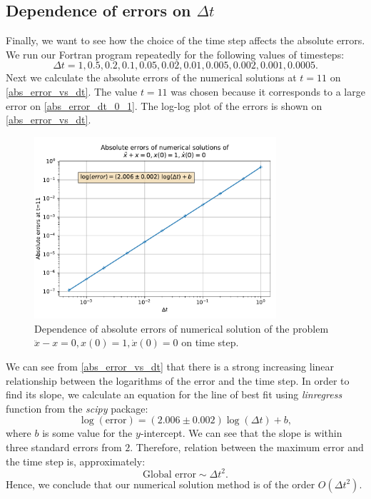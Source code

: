 \subsection{Dependence of errors on $\Delta t$}

Finally, we want to see how the choice of the time step affects the absolute errors. We run our Fortran program repeatedly for the following values of timesteps:
\[
  \Delta t = 1, 0.5, 0.2, 0.1, 0.05, 0.02, 0.01, 0.005, 0.002, 0.001, 0.0005.
\]
Next we calculate the absolute errors of the numerical solutions at $t=11$ on \autoref{abs_error_vs_dt}. The value $t=11$ was chosen because it corresponds to a large error on \autoref{abs_error_dt_0_1}. The log-log plot of the errors is shown on \autoref{abs_error_vs_dt}.

\begin{figure}[H]
  \centering
  \includegraphics[width=0.8\textwidth]{figures/abs_error_vs_dt.pdf}
  \caption{Dependence of absolute errors of numerical solution of the problem $\ddot{x} - x = 0, x(0)=1, \dot{x}(0)=0$ on time step.}
  \label{abs_error_vs_dt}
\end{figure}

We can see from \autoref{abs_error_vs_dt} that there is a strong increasing linear relationship between the logarithms of the error and the time step. In order to find its slope, we calculate an equation for the line of best fit using \emph{linregress} function from the \emph{scipy} package:
\[
  \log(\textrm{error}) = (2.006 \pm 0.002) \log(\Delta t) + b,
\]
where $b$ is some value for the $y$-intercept. We can see that the slope is within three standard errors from $2$. Therefore, relation between the maximum error and the time step is, approximately:
\[
  \textrm{Global error} \sim \Delta t^2.
\]
Hence, we conclude that our numerical solution method is of the order $O(\Delta t^2)$.


